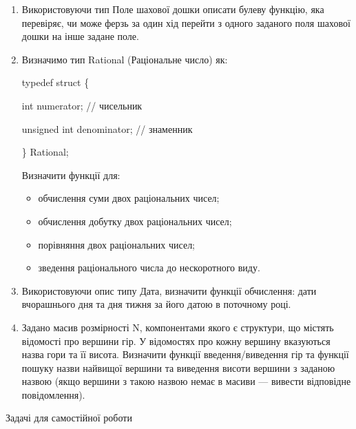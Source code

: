 \documentclass[]{article}
\makeatletter
\newcommand{\xslalph}[1]{\expandafter\@xslalph\csname c@#1\endcsname}
\newcommand{\@xslalph}[1]{%
    \ifcase#1\or а\or б\or в\or г\or д\or e\or є\or ж\or з\or i%
    \or й\or к\or л\or м\or н\or о\or п\or р\or с\or т%
    \or у\or ф\or х\or ц\or ч\or ш\or ю\or я\or аа\or бб\or вв%
    \else\@ctrerr\fi%
}
\makeatother
\begin{document}
\begin{enumerate}
\begin{enumerate}[label=\xslalph*)]
\begin{enumerate}
\begin{enumerate}[label=\xslalph*)]
\begin{enumerate}
\item
 Використовуючи тип Поле шахової дошки описати булеву функцію, яка
перевіряє, чи може ферзь за один хід перейти з одного заданого поля
шахової дошки на інше задане поле.

\item
 Визначимо тип Rational (Раціональне число) як:

typedef struct \{

int numerator; // чисельник

unsigned int denominator; // знаменник

\} Rational;

Визначити функції для:
\begin{itemize}
\item обчислення суми двох раціональних чисел;
\item обчислення добутку двох раціональних чисел;
\item порівняння двох раціональних чисел;
\item зведення раціонального числа до нескоротного виду.
\end{itemize}

\item
 Використовуючи опис типу Дата, визначити функції обчислення:
дати вчорашнього дня та дня тижня за його датою в поточному році.

\item
 Задано масив розмірності N, компонентами якого є структури, що містять відомості про вершини гір. У
відомостях про кожну вершину вказуються назва гори та її висота.
Визначити функції введення/виведення гір та функції пошуку назви
найвищої вершини та виведення висоти вершини з заданою назвою (якщо
вершини з такою назвою немає в масиви --- вивести відповідне
повідомлення).
\end{enumerate}

Задачі для самостійної роботи


\end{enumerate}
\end{enumerate}
\end{enumerate}
\end{enumerate}
\end{document}
